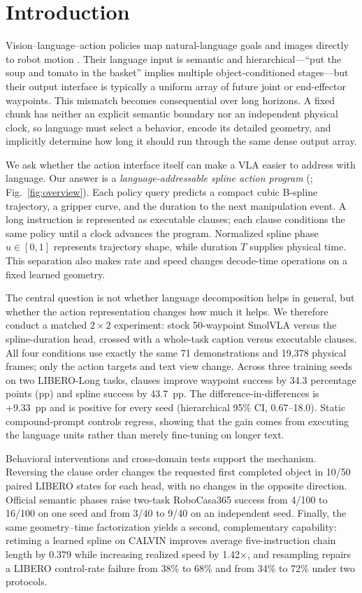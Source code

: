 \section{Introduction}
\label{sec:introduction}

Vision--language--action policies map natural-language goals and images directly to robot motion \cite{kim2024openvla,black2024pi0,shukor2025smolvla}. Their language input is semantic and hierarchical---``put the soup and tomato in the basket'' implies multiple object-conditioned stages---but their output interface is typically a uniform array of future joint or end-effector waypoints. This mismatch becomes consequential over long horizons. A fixed chunk has neither an explicit semantic boundary nor an independent physical clock, so language must select a behavior, encode its detailed geometry, and implicitly determine how long it should run through the same dense output array.

We ask whether the action interface itself can make a VLA easier to address with language. Our answer is a \emph{language-addressable spline action program} (\method; Fig.~\ref{fig:overview}). Each policy query predicts a compact cubic B-spline trajectory, a gripper curve, and the duration to the next manipulation event. A long instruction is represented as executable clauses; each clause conditions the same policy until a clock advances the program. Normalized spline phase $u\in[0,1]$ represents trajectory shape, while duration $T$ supplies physical time. This separation also makes rate and speed changes decode-time operations on a fixed learned geometry.

The central question is not whether language decomposition helps in general, but whether the action representation changes how much it helps. We therefore conduct a matched $2\!\times\!2$ experiment: stock 50-waypoint SmolVLA versus the spline-duration head, crossed with a whole-task caption versus executable clauses. All four conditions use exactly the same 71 demonstrations and 19,378 physical frames; only the action targets and text view change. Across three training seeds on two LIBERO-Long tasks, clauses improve waypoint success by 34.3 percentage points (pp) and spline success by 43.7~pp. The difference-in-differences is +9.33~pp and is positive for every seed (hierarchical 95\% CI, 0.67--18.0). Static compound-prompt controls regress, showing that the gain comes from executing the language units rather than merely fine-tuning on longer text.

Behavioral interventions and cross-domain tests support the mechanism. Reversing the clause order changes the requested first completed object in 10/50 paired LIBERO states for each head, with no changes in the opposite direction. Official semantic phases raise two-task RoboCasa365 success from 4/100 to 16/100 on one seed and from 3/40 to 9/40 on an independent seed. Finally, the same geometry--time factorization yields a second, complementary capability: retiming a learned spline on CALVIN improves average five-instruction chain length by 0.379 while increasing realized speed by 1.42$\times$, and resampling repairs a LIBERO control-rate failure from 38\% to 68\% and from 34\% to 72\% under two protocols.


